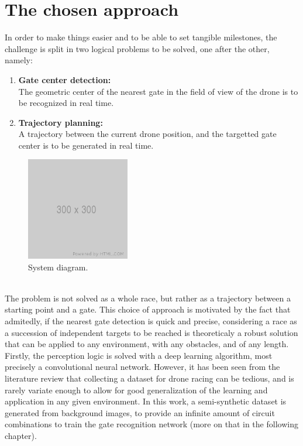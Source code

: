 \section{The chosen approach}


In order to make things easier and to be able to set tangible milestones, the
challenge is split in two logical problems to be solved, one after the
other, namely:
\begin{enumerate}
	\item{\textbf{Gate center detection:\\}
			The geometric center of the nearest gate in the field of view of the
			drone is to be recognized in real time.
	}
	\item{\textbf{Trajectory planning:\\}
			A trajectory between the current drone position, and the targetted gate
			center is to be generated in real time.
	}
\end{enumerate}

\begin{figure}[h!]
	\centering
	\includegraphics[width=0.4\textwidth]{figure/300x300.png}
	\caption{System diagram.}
	\label{fig:system}
\end{figure}

~\\The problem is not solved as a whole race, but rather as a trajectory
between a starting point and a gate. This choice of approach is motivated by
the fact that admitedly, if the nearest gate detection is quick and precise,
considering a race as a succession of independent targets to be reached is
theoreticaly a robust solution that can be applied to any environment, with any
obstacles, and of any length.\\

Firstly, the perception logic is solved with a deep learning algorithm, most
precisely a convolutional neural network. However, it has been seen from
the literature review that collecting a dataset for drone racing can be
tedious, and is rarely variate enough to allow for good generalization of the
learning and application in any given environment. In this work, a
semi-synthetic dataset is generated from background images, to provide an
infinite amount of circuit combinations to train the gate recognition network
(more on that in the following chapter).

